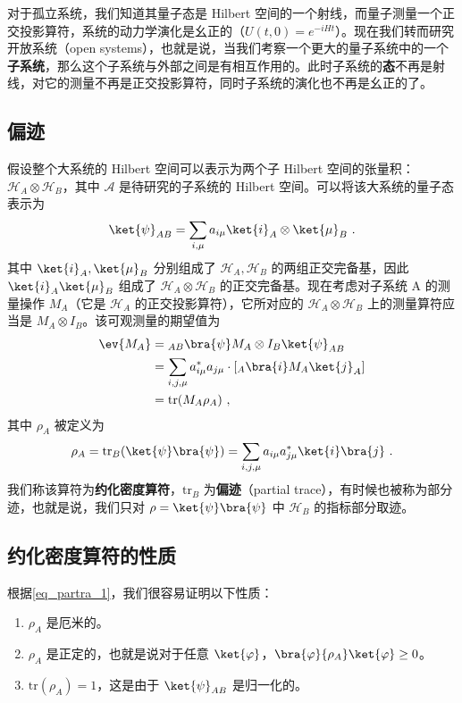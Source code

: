 

对于孤立系统，我们知道其量子态是 Hilbert 空间的一个射线，而量子测量一个正交投影算符，系统的动力学演化是幺正的（$U(t,0)=e^{-iHt}$）。现在我们转而研究开放系统（open systems），也就是说，当我们考察一个更大的量子系统中的一个\textbf{子系统}，那么这个子系统与外部之间是有相互作用的。此时子系统的\textbf{态}不再是射线，对它的测量不再是正交投影算符，同时子系统的演化也不再是幺正的了。
\subsection{偏迹}
假设整个大系统的 Hilbert 空间可以表示为两个子 Hilbert 空间的张量积：$\mathcal{H}_A\otimes \mathcal{H}_B$，其中 $\mathcal A$ 是待研究的子系统的 Hilbert 空间。可以将该大系统的量子态表示为
\begin{equation}
\ket{\psi}_{AB}=\sum_{i,\mu}a_{i\mu}\ket{i}_A\otimes \ket{\mu}_B~.
\end{equation}
其中 $\ket{i}_A,\ket{\mu}_B$ 分别组成了 $\mathcal{H}_A, \mathcal{H}_B$ 的两组正交完备基，因此 $\ket{i}_A\ket{\mu}_B$ 组成了 $\mathcal{H}_A\otimes \mathcal{H}_B$ 的正交完备基。现在考虑对子系统 A 的测量操作 $M_A$（它是 $\mathcal H_A$ 的正交投影算符），它所对应的 $\mathcal{H}_A\otimes \mathcal{H}_B$ 上的测量算符应当是 $M_A\otimes I_B$。该可观测量的期望值为
\begin{equation}
\begin{aligned}
\ev{M_A}&={}_{AB}\bra{\psi}M_A\otimes I_B \ket{\psi}_{AB}\\
&=\sum_{i,j,\mu}a_{i\mu}^*a_{j\mu} \cdot [{}_A\bra{i} M_A \ket{j}_A]\\
&=\text{tr}(M_A \rho_A)~,
\end{aligned}
\end{equation}
其中 $\rho_A$ 被定义为
\begin{equation}\label{eq_partra_1}
\rho_A=\text{tr}_B(\ket{\psi}\bra{\psi})=\sum_{i,j,\mu}a_{i\mu}a_{j\mu}^*\ket{i}\bra{j}~.
\end{equation}
我们称该算符为\textbf{约化密度算符}，$\text{tr}_B$ 为\textbf{偏迹}（partial trace），有时候也被称为部分迹，也就是说，我们只对 $\rho=\ket{\psi}\bra{\psi}$ 中 $\mathcal{H}_B$ 的指标部分取迹。

\subsection{约化密度算符的性质}
根据\autoref{eq_partra_1}，我们很容易证明以下性质：
\begin{enumerate}
\item $\rho_A$ 是厄米的。
\item $\rho_A$ 是正定的，也就是说对于任意 $\ket{\varphi}$，$\bra{\varphi}{\rho_A}\ket{\varphi}\ge 0$。
\item $\text{tr}(\rho_A)=1$，这是由于 $\ket{\psi}_{AB}$ 是归一化的。
\end{enumerate}

